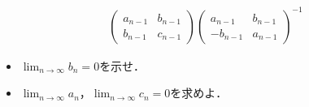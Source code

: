 \documentclass[../../main.tex]{subfiles}
\begin{document}
\begin{enumerate}
\begin{align}
\begin{pmatrix}
        a_{n-1} & b_{n-1} \\
        b_{n-1} & c_{n-1}
      \end{pmatrix}
      \begin{pmatrix}
        a_{n-1}  & b_{n-1} \\
        -b_{n-1} & a_{n-1}
      \end{pmatrix}^{-1}
    \end{align}
    \begin{itemize}
      \item[ア] $\lim_{n\to\infty}b_n=0$を示せ．
      \item[イ] $\lim_{n\to\infty}a_n$，$\lim_{n\to\infty}c_n=0$を求めよ．
    \end{itemize}
\end{enumerate}
\end{document}
